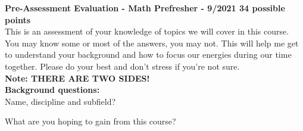 \documentclass[10pt]{article}
\begin{document}
\noindent\textbf{Pre-Assessment Evaluation  - Math Prefresher - 9/2021 34 possible points} \\
This is an assessment of your knowledge of topics we will cover in this course. You may know some or most of the answers, you may not. This will help me get to understand your background and how to focus our energies during our time together. Please do your best and don't stress if you're not sure.  \\\textbf{Note: THERE ARE TWO SIDES!} \\

\noindent \textbf{Background questions:} \\
\indent Name, discipline and subfield? \\
\vspace{3mm}

 What are you hoping to gain from this course? \\
\vspace{4mm}
\end{document}
